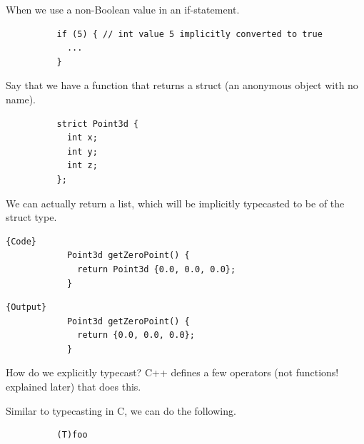 \documentclass{article}
\newcounter{definition}[section]
\begin{document}
      \begin{lemma}
        \label{thm:truthy-and-falsy-values}
        When we use a non-Boolean value in an if-statement. 
        \begin{lstlisting}
          if (5) { // int value 5 implicitly converted to true
            ...
          }
        \end{lstlisting}
      \end{lemma}

      \begin{lemma}
        \label{thm:returning-structs}
        Say that we have a function that returns a struct (an anonymous object with no name). 
        \begin{lstlisting}
          strict Point3d {
            int x; 
            int y; 
            int z; 
          };
        \end{lstlisting}

        We can actually return a list, which will be implicitly typecasted to be of the struct type. 

        \noindent\begin{minipage}{.5\textwidth}
          \begin{lstlisting}[]{Code}
            Point3d getZeroPoint() {
              return Point3d {0.0, 0.0, 0.0}; 
            }
          \end{lstlisting}
          \end{minipage}
          \hfill
          \begin{minipage}{.49\textwidth}
          \begin{lstlisting}[]{Output}
            Point3d getZeroPoint() {
              return {0.0, 0.0, 0.0}; 
            }
          \end{lstlisting}
        \end{minipage}
      \end{lemma}

      How do we explicitly typecast? C++ defines a few operators (not functions! explained later) that does this. 

      \begin{definition}
        \label{def:c-style-cast}
        Similar to typecasting in C, we can do the following. 
        \begin{lstlisting}
          (T)foo
        \end{lstlisting}
      \end{definition}
      
\end{document}
